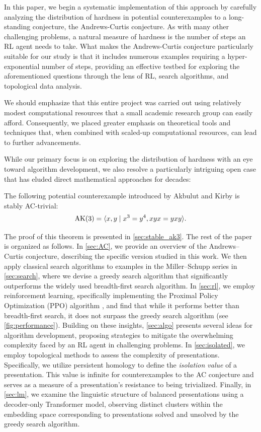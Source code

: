 In this paper, we begin a systematic implementation of this approach by carefully analyzing the distribution of hardness in potential counterexamples to a long-standing conjecture, the Andrews-Curtis conjecture. As with many other challenging problems, a natural measure of hardness is the number of steps an RL agent needs to take. What makes the Andrews-Curtis conjecture particularly suitable for our study is that it includes numerous examples requiring a hyper-exponential number of steps, providing an effective testbed for exploring the aforementioned questions through the lens of RL, search algorithms, and topological data analysis.

We should emphasize that this entire project was carried out using relatively modest computational resources that a small academic research group can easily afford. Consequently, we placed greater emphasis on theoretical tools and techniques that, when combined with scaled-up computational resources, can lead to further advancements.

While our primary focus is on exploring the distribution of hardness with an eye toward algorithm development, we also resolve a particularly intriguing open case that has eluded direct mathematical approaches for decades:

\begin{theorem}\label{thm:stableAK3}
    The following potential counterexample introduced by Akbulut and Kirby \cite{Akbulut--Kirby} is stably AC-trivial:
    \[
    \text{AK}(3) = \langle x, y \mid x^3 = y^{4}, xyx = yxy\rangle.
    \]
\end{theorem}

\medskip\noindent
The proof of this theorem is presented in \autoref{sec:stable_ak3}.
The rest of the paper is organized as follows. In \autoref{sec:AC}, we provide an overview of the Andrews--Curtis conjecture, describing the specific version studied in this work. We then apply classical search algorithms to examples in the Miller--Schupp series in \autoref{sec:search}, where we devise a greedy search algorithm that significantly outperforms the widely used breadth-first search algorithm. In \autoref{sec:rl}, we employ reinforcement learning, specifically implementing the Proximal Policy Optimization (PPO) algorithm \cite{schulman2017proximal}, and find that while it performs better than breadth-first search, it does not surpass the greedy search algorithm (see \autoref{fig:performance}). Building on these insights, \autoref{sec:algo} presents several ideas for algorithm development, proposing strategies to mitigate the overwhelming complexity faced by an RL agent in challenging problems. In \autoref{sec:isolated}, we employ topological methods to assess the complexity of presentations. Specifically, we utilize persistent homology to define the \textit{isolation value} of a presentation. This value is infinite for counterexamples to the AC conjecture and serves as a measure of a presentation's resistance to being trivialized. Finally, in \autoref{sec:lm}, we examine the linguistic structure of balanced presentations using a decoder-only Transformer model, observing distinct clusters within the embedding space corresponding to presentations solved and unsolved by the greedy search algorithm.

